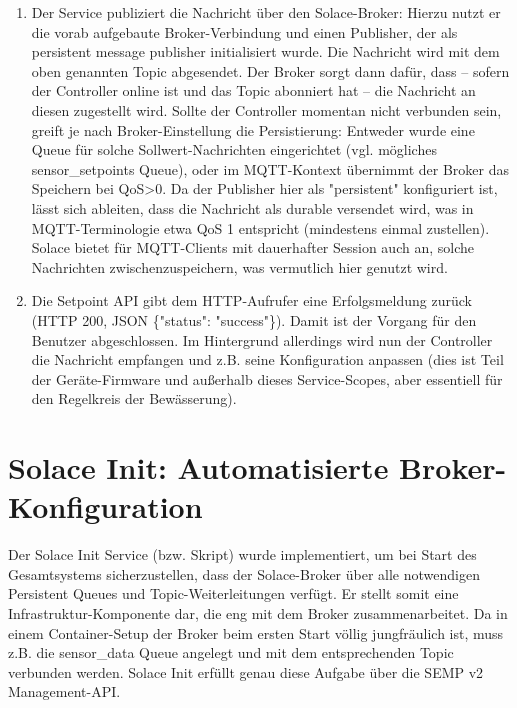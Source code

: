 \begin{enumerate}
    \item Der Service publiziert die Nachricht über den Solace-Broker: Hierzu nutzt er die vorab aufgebaute Broker-Verbindung und einen Publisher, der als persistent message publisher initialisiert wurde. Die Nachricht wird mit dem oben genannten Topic abgesendet. Der Broker sorgt dann dafür, dass – sofern der Controller online ist und das Topic abonniert hat – die Nachricht an diesen zugestellt wird. Sollte der Controller momentan nicht verbunden sein, greift je nach Broker-Einstellung die Persistierung: Entweder wurde eine Queue für solche Sollwert-Nachrichten eingerichtet (vgl. mögliches sensor\_setpoints Queue), oder im MQTT-Kontext übernimmt der Broker das Speichern bei QoS>0. Da der Publisher hier als "persistent" konfiguriert ist, lässt sich ableiten, dass die Nachricht als durable versendet wird, was in MQTT-Terminologie etwa QoS 1 entspricht (mindestens einmal zustellen). Solace bietet für MQTT-Clients mit dauerhafter Session auch an, solche Nachrichten zwischenzuspeichern, was vermutlich hier genutzt wird.
    \item Die Setpoint API gibt dem HTTP-Aufrufer eine Erfolgsmeldung zurück (HTTP 200, JSON \{"status": "success"\}). Damit ist der Vorgang für den Benutzer abgeschlossen. Im Hintergrund allerdings wird nun der Controller die Nachricht empfangen und z.B. seine Konfiguration anpassen (dies ist Teil der Geräte-Firmware und außerhalb dieses Service-Scopes, aber essentiell für den Regelkreis der Bewässerung).
\end{enumerate}

\section{Solace Init: Automatisierte Broker-Konfiguration}
Der Solace Init Service (bzw. Skript) wurde implementiert, um bei Start des Gesamtsystems sicherzustellen, dass der Solace-Broker über alle notwendigen Persistent Queues und Topic-Weiterleitungen verfügt. Er stellt somit eine Infrastruktur-Komponente dar, die eng mit dem Broker zusammenarbeitet. Da in einem Container-Setup der Broker beim ersten Start völlig jungfräulich ist, muss z.B. die sensor\_data Queue angelegt und mit dem entsprechenden Topic verbunden werden. Solace Init erfüllt genau diese Aufgabe über die SEMP v2 Management-API.
